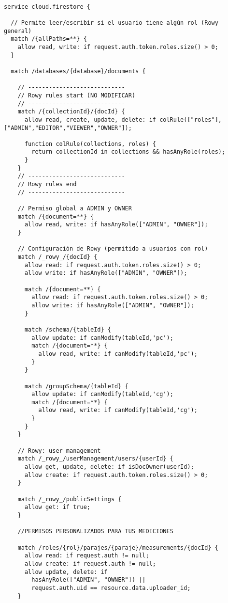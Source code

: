 \begin{verbatim}

service cloud.firestore {
  
  // Permite leer/escribir si el usuario tiene algún rol (Rowy general)
  match /{allPaths=**} {
    allow read, write: if request.auth.token.roles.size() > 0;
  }

  match /databases/{database}/documents {

    // ----------------------------
    // Rowy rules start (NO MODIFICAR)
    // ----------------------------
    match /{collectionId}/{docId} {
      allow read, create, update, delete: if colRule(["roles"], ["ADMIN","EDITOR","VIEWER","OWNER"]);
      
      function colRule(collections, roles) {
        return collectionId in collections && hasAnyRole(roles);
      }
    }
    // ----------------------------
    // Rowy rules end
    // ----------------------------

    // Permiso global a ADMIN y OWNER
    match /{document=**} {
      allow read, write: if hasAnyRole(["ADMIN", "OWNER"]);
    }

    // Configuración de Rowy (permitido a usuarios con rol)
    match /_rowy_/{docId} {
      allow read: if request.auth.token.roles.size() > 0;
      allow write: if hasAnyRole(["ADMIN", "OWNER"]);

      match /{document=**} {
        allow read: if request.auth.token.roles.size() > 0;
        allow write: if hasAnyRole(["ADMIN", "OWNER"]);
      }

      match /schema/{tableId} {
        allow update: if canModify(tableId,'pc');
        match /{document=**} {
          allow read, write: if canModify(tableId,'pc');
        }
      }

      match /groupSchema/{tableId} {
        allow update: if canModify(tableId,'cg');
        match /{document=**} {
          allow read, write: if canModify(tableId,'cg');
        }
      }
    }

    // Rowy: user management
    match /_rowy_/userManagement/users/{userId} {
      allow get, update, delete: if isDocOwner(userId);
      allow create: if request.auth.token.roles.size() > 0;
    }

    match /_rowy_/publicSettings {
      allow get: if true;
    }

    //PERMISOS PERSONALIZADOS PARA TUS MEDICIONES

    match /roles/{rol}/parajes/{paraje}/measurements/{docId} {
      allow read: if request.auth != null;
      allow create: if request.auth != null;
      allow update, delete: if 
        hasAnyRole(["ADMIN", "OWNER"]) || 
        request.auth.uid == resource.data.uploader_id;
    }


\end{verbatim}
